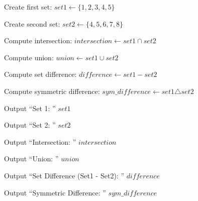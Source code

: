 \begin{algorithm}
\caption{Perform Basic Set Operations}
\begin{algorithmic}[1]

\STATE Create first set:
\STATE $set1 \gets \{1,2,3,4,5\}$

\STATE Create second set:
\STATE $set2 \gets \{4,5,6,7,8\}$

\STATE Compute intersection:
\STATE $intersection \gets set1 \cap set2$

\STATE Compute union:
\STATE $union \gets set1 \cup set2$

\STATE Compute set difference:
\STATE $difference \gets set1 - set2$

\STATE Compute symmetric difference:
\STATE $sym\_difference \gets set1 \triangle set2$

\STATE Output ``Set 1: '' $set1$

\STATE Output ``Set 2: '' $set2$

\STATE Output ``Intersection: '' $intersection$

\STATE Output ``Union: '' $union$

\STATE Output ``Set Difference (Set1 - Set2): '' $difference$

\STATE Output ``Symmetric Difference: '' $sym\_difference$

\end{algorithmic}
\end{algorithm}